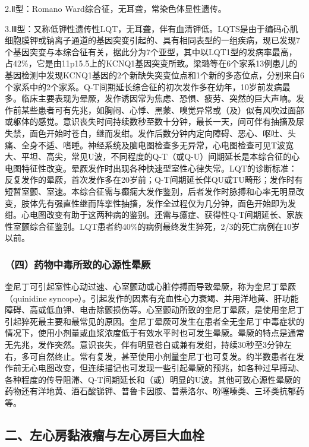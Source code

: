 2.Ⅱ型：Romano Ward综合征，无耳聋，常染色体显性遗传。

3.Ⅲ型：又称低钾性遗传性LQT，无耳聋，伴有血清钾低。LQTS是由于编码心肌细胞膜钾或钠离子通道的基因突变引起的、具有相同表型的一组疾病，现已发现7个基因突变与本综合征有关，据此分为7个亚型，其中以LQT1型的发病率最高，占42\%，它是由11p15.5上的KCNQ1基因突变所致。梁璐等在6个家系13例患儿的基因检测中发现KCNQ1基因的2个新缺失突变位点和1个新的多态位点，分别来自6个家系中的2个家系。Q-T间期延长综合征的初次发作多在幼年，10岁前发病最多。临床主要表现为晕厥，发作诱因常为焦虑、恐惧、疲劳、突然的巨大声响。发作前某些患者可有先兆，如胸闷、心悸、黑蒙、嗅觉异常或（及）似有风吹过面部或躯体的感觉。意识丧失时间持续数秒至数十分钟，最长一天，间可伴有抽搐及尿失禁，面色开始时苍白，继而发绀。发作后数分钟内定向障碍、恶心、呕吐、头痛、全身不适、嗜睡。神经系统及脑电图检查多无异常，心电图检查可见T波宽大、平坦、高尖，常见U波，不同程度的Q-T（或Q-U）间期延长是本综合征的心电图特征性改变。晕厥发作时出现各种快速型室性心律失常。LQT的诊断标准：反复发作的晕厥，首次发作多在20岁前；Q-T间期延长伴QU或TU畸形；发作时有短暂室颤、室速。本综合征需与癫痫大发作鉴别，后者发作时脉搏和心率无明显改变，肢体先有强直性继而阵挛性抽搐，发作全过程仅为几分钟，面色开始即为发绀。心电图改变有助于这两种病的鉴别。还需与癔症、获得性Q-T间期延长、家族性室颤综合征鉴别。LQT患者约40\%的病例最终发生猝死，2/3的死亡病例在10岁以前。

\subsubsection{（四）药物中毒所致的心源性晕厥}

奎尼丁可引起室性心动过速、心室颤动或心脏停搏而导致晕厥，称为奎尼丁晕厥（quinidine
syncope）。引起发作的因素有充血性心力衰竭、并用洋地黄、肝功能障碍、高或低血钾、电击除颤损伤等。心室颤动所致的奎尼丁晕厥，是使用奎尼丁引起猝死最主要和最常见的原因。奎尼丁晕厥可发生在患者全无奎尼丁中毒症状的情况下，使用小剂量或血浆浓度低于有效水平时也可发生晕厥。晕厥的特点是通常无先兆，发作突然。意识丧失，伴有明显苍白或兼有发绀，持续30秒至3分钟左右，多可自然终止。常有复发，甚至使用小剂量奎尼丁也可复发。约半数患者在发作前无心电图改变，但连续描记也可发现一些引起晕厥的预兆，如各种过早搏动、各种程度的传导阻滞、Q-T间期延长和（或）明显的U波。其他可致心源性晕厥的药物还有洋地黄、酒石酸锑钾、普鲁卡因胺、普萘洛尔、吩噻嗪类、三环类抗郁药等。

\subsection{二、左心房黏液瘤与左心房巨大血栓}

